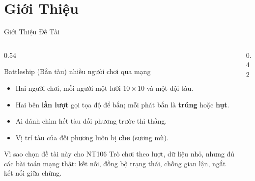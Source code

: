 \section{Giới Thiệu}

\begin{frame}[label=gt]{Giới Thiệu Đề Tài}
  \begin{columns}[T]
    \begin{column}{0.54\textwidth}
      \begin{block}{Battleship (Bắn tàu) nhiều người chơi qua mạng}
        \begin{itemize}
          \item Hai người chơi, mỗi người một lưới $10\times10$ và một đội tàu.
          \item Hai bên \textbf{lần lượt} gọi tọa độ để bắn; mỗi phát bắn là \textbf{trúng} hoặc \textbf{hụt}.
          \item Ai đánh chìm hết tàu đối phương trước thì thắng.
          \item Vị trí tàu của đối phương luôn bị \textbf{che} (sương mù).
        \end{itemize}
      \end{block}
      \begin{exampleblock}{Vì sao chọn đề tài này cho NT106}
        Trò chơi theo lượt, dữ liệu nhỏ, nhưng đủ các bài toán mạng thật: kết nối, đồng bộ trạng thái, chống gian lận, ngắt kết nối giữa chừng.
      \end{exampleblock}
    \end{column}
    \begin{column}{0.42\textwidth}
      \centering
    \end{column}
  \end{columns}
\end{frame}

